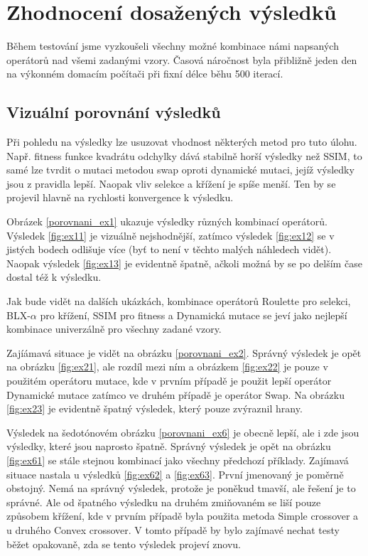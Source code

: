 \documentclass[a4paper,11pt]{scrartcl}
\begin{document}
\section{Zhodnocení dosažených výsledků}
Během testování jsme vyzkoušeli všechny možné kombinace námi napsaných operátorů nad všemi zadanými vzory. Časová náročnost byla přibližně jeden den na výkonném domacím počítači při fixní délce běhu 500 iterací. 

\subsection{Vizuální porovnání výsledků}
Při pohledu na výsledky lze usuzovat vhodnost některých metod pro tuto úlohu. Např. fitness funkce kvadrátu odchylky dává stabilně horší výsledky než SSIM, to samé lze tvrdit o mutaci metodou swap oproti dynamické mutaci, jejíž výsledky jsou z pravidla lepší. Naopak vliv selekce a křížení je spíše menší. Ten by se projevil hlavně na rychlosti konvergence k výsledku.


Obrázek \ref{porovnani_ex1} ukazuje výsledky různých kombinací operátorů. Výsledek \ref{fig:ex11} je vizuálně nejshodnější, zatímco výsledek \ref{fig:ex12} se v jistých bodech odlišuje více (byť to není v těchto malých náhledech vidět). Naopak výsledek \ref{fig:ex13} je evidentně špatně, ačkoli možná by se po delším čase dostal též k výsledku.

Jak bude vidět na dalších ukázkách, kombinace operátorů Roulette pro selekci, BLX-$\alpha$ pro křížení, SSIM pro fitness a Dynamická mutace se jeví jako nejlepší kombinace univerzálně pro všechny zadané vzory.

Zajíámavá situace je vidět na obrázku \ref{porovnani_ex2}. Správný výsledek je opět na obrázku \ref{fig:ex21}, ale rozdíl mezi ním a obrázkem \ref{fig:ex22} je pouze v použitém operátoru mutace, kde v prvním případě je použit lepší operátor Dynamické mutace zatímco ve druhém případě je operátor Swap. Na obrázku \ref{fig:ex23} je evidentně špatný výsledek, který pouze zvýraznil hrany.

Výsledek na šedotónovém obrázku \ref{porovnani_ex6} je obecně lepší, ale i zde jsou výsledky, které jsou naprosto špatně. Správný výsledek je opět na obrázku \ref{fig:ex61} se stále stejnou kombinací jako všechny předchozí příklady. Zajímavá situace nastala u výsledků \ref{fig:ex62} a \ref{fig:ex63}. První jmenovaný je poměrně obstojný. Nemá na správný výsledek, protože je poněkud tmavší, ale řešení je to správné. Ale od špatného výsledku na druhém zmiňovaném se liší pouze způsobem křížení, kde v prvním případě byla použita metoda Simple crossover a u druhého Convex crossover. V tomto případě by bylo zajímavé nechat testy běžet opakovaně, zda se tento výsledek projeví znovu.
\end{document}
